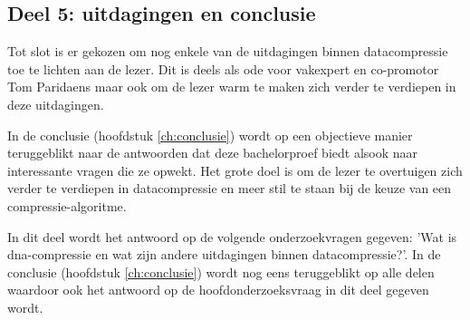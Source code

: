 \subsection{Deel 5: uitdagingen en conclusie}
\label{sec:aanpak-bachelorproef-deel-5}

Tot slot is er gekozen om nog enkele van de uitdagingen binnen \gls{datacompressie} toe te lichten aan de lezer. Dit is deels als ode voor vakexpert en co-promotor Tom Paridaens maar ook om de lezer warm te maken zich verder te verdiepen in deze uitdagingen.

In de conclusie (hoofdstuk \ref{ch:conclusie}) wordt op een objectieve manier teruggeblikt naar de antwoorden dat deze bachelorproef biedt alsook naar interessante vragen die ze opwekt. Het grote doel is om de lezer te overtuigen zich verder te verdiepen in \gls{datacompressie} en meer stil te staan bij de keuze van een \gls{compressie-algoritme}.

In dit deel wordt het antwoord op de volgende onderzoekvragen gegeven: 'Wat is \gls{dna-compressie} en wat zijn andere uitdagingen binnen \gls{datacompressie}?'. In de conclusie (hoofdstuk \ref{ch:conclusie}) wordt nog eens teruggeblikt op alle delen waardoor ook het antwoord op de hoofdonderzoeksvraag in dit deel gegeven wordt.